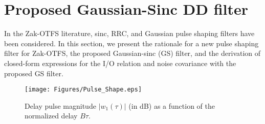\vspace{-1mm}
\section{Proposed Gaussian-Sinc DD filter} 
\label{sec4}
In the Zak-OTFS literature, sinc, RRC, and Gaussian pulse shaping filters have been considered. In this section, we present the rationale for a new pulse shaping filter for Zak-OTFS, the proposed Gaussian-sinc (GS) filter, and the derivation of closed-form expressions for the I/O relation and noise covariance with the proposed GS filter.  

\begin{figure}
\centering
\texttt{[image: Figures/Pulse\_Shape.eps]}
\caption{Delay pulse magnitude $|w_{1}(\tau)|$ (in dB) as a function of the normalized delay $B\tau$.}
\label{pulse_shapes}
\end{figure}

\vspace{-3mm}
